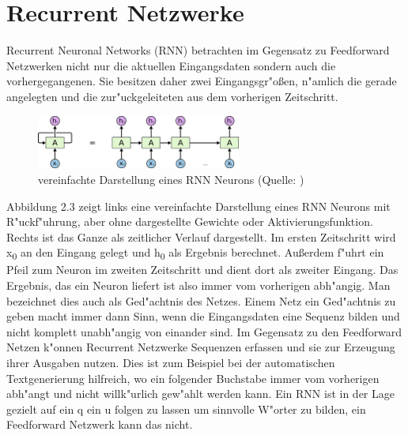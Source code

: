 {\section{Recurrent Netzwerke}
Recurrent Neuronal Networks (RNN) betrachten im Gegensatz zu Feedforward Netzwerken nicht nur die aktuellen Eingangsdaten sondern auch die vorhergegangenen. Sie besitzen daher zwei Eingangsgr"o{\ss}en, n"amlich die gerade angelegten und die zur"uckgeleiteten aus dem vorherigen Zeitschritt.
\renewcommand{\figurename}{Abb.}
\begin{figure}[htp]
\centering
\includegraphics[width=0.60\textwidth]{pictures/RNN-unrolled.png}
\caption[RNN Neuron]{vereinfachte Darstellung eines RNN Neurons (Quelle: \cite{OlahImg})}
\end{figure}
Abbildung 2.3 zeigt links eine vereinfachte Darstellung eines RNN Neurons mit R"uckf"uhrung, aber ohne dargestellte Gewichte oder Aktivierungsfunktion. Rechts ist das Ganze als zeitlicher Verlauf dargestellt. Im ersten Zeitschritt wird x\textsubscript{0} an den Eingang gelegt und h\textsubscript{0} als Ergebnis berechnet. Au{\ss}erdem f"uhrt ein Pfeil zum Neuron im zweiten Zeitschritt und dient dort als zweiter Eingang. Das Ergebnis, das ein Neuron liefert ist also immer vom vorherigen abh"angig. Man bezeichnet dies auch als Ged"achtnis des Netzes. Einem Netz ein Ged"achtnis zu geben macht immer dann Sinn, wenn die Eingangsdaten eine Sequenz bilden und nicht komplett unabh"angig von einander sind. Im Gegensatz zu den Feedforward Netzen k"onnen Recurrent Netzwerke Sequenzen erfassen und sie zur Erzeugung ihrer Ausgaben nutzen. Dies ist zum Beispiel bei der automatischen Textgenerierung hilfreich, wo ein folgender Buchstabe immer vom vorherigen abh"angt und nicht willk"urlich gew"ahlt werden kann. Ein RNN ist in der Lage gezielt auf ein q ein u folgen zu lassen um sinnvolle W"orter zu bilden, ein Feedforward Netzwerk kann das nicht.

}
